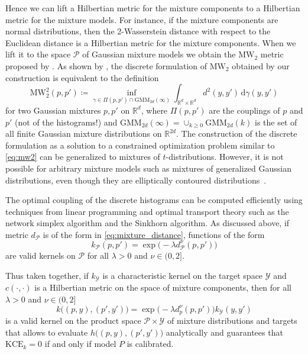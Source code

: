 \documentclass{article}
\begin{document}
Hence we can lift a Hilbertian metric for the mixture components to a Hilbertian
metric for the mixture models. For instance, if the mixture components are normal
distributions, then the 2-Wasserstein distance with respect to the Euclidean distance is
a Hilbertian metric for the mixture components. When we lift it to the space $\mathcal{P}$
of Gaussian mixture models we obtain the $\mathrm{MW}_2$ metric proposed by
\citet{Delon2019,Chen2019,Chen2020}. As shown by \citet{Delon2019},
the discrete formulation of $\mathrm{MW}_2$ obtained by our construction is
equivalent to the definition
\begin{equation}\label{eq:mw2}
    \mathrm{MW}^2_2(p, p') \coloneqq \inf_{\gamma \in \Pi(p, p') \cap \mathrm{GMM}_{2d}(\infty)}
    \int_{\mathbb{R}^d \times \mathbb{R}^d} d^2(y, y') \,\mathrm{d}\gamma(y,y') 
\end{equation}
for two Gaussian mixtures $p, p'$ on $\mathbb{R}^d$, where $\Pi(p, p')$ are the
couplings of $p$ and $p'$ (not of the histograms!) and $\mathrm{GMM}_{2d}(\infty) = 
\cup_{k \geq 0} \mathrm{GMM}_{2d}(k)$ is the set of all finite Gaussian mixture distributions
on $\mathbb{R}^{2d}$. The construction of the discrete formulation as a solution to
a constrained optimization problem similar to \cref{eq:mw2} can be generalized to
mixtures of $t$-distributions. However, it is not possible for arbitrary mixture models
such as mixtures of generalized Gaussian distributions, even though they are
elliptically contoured distributions~\citep{Deledalle2018,Delon2019}.

The optimal coupling of the discrete histograms
can be computed efficiently using techniques from linear programming and optimal
transport theory such as the network simplex algorithm and the Sinkhorn algorithm.
As discussed above, if metric $d_{\mathcal{P}}$ is of the form in
\cref{eq:mixture_distance}, functions of the form
\begin{equation*}
    k_{\mathcal{P}}(p, p') = \exp{\big(- \lambda d^\nu_{\mathcal{P}}(p, p')\big)}
\end{equation*}
are valid kernels on $\mathcal{P}$ for all $\lambda > 0$ and $\nu \in (0, 2]$.

Thus taken together, if $k_{\mathcal{Y}}$ is a characteristic kernel on the
target space $\mathcal{Y}$ and $c(\cdot, \cdot)$ is a Hilbertian
metric on the space of mixture components, then for all $\lambda > 0$
and $\nu \in (0, 2]$
\begin{equation*}
    k\big((p, y), (p', y')\big) = \exp{\big(-\lambda d^\nu_p(p, p')\big)} k_{\mathcal{Y}}(y, y')
\end{equation*}
is a valid kernel on the product space $\mathcal{P} \times \mathcal{Y}$
of mixture distributions and targets that allows to evaluate $h\big((p, y), (p', y')\big)$
analytically and guarantees that $\mathrm{KCE}_k = 0$ if and only if
model $P$ is calibrated.
\end{document}

